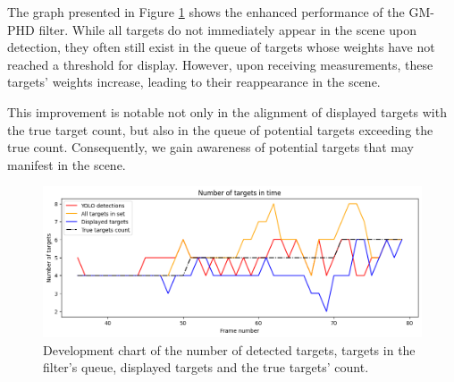 The graph presented in Figure \ref{gr:E1-V1-S1} shows the enhanced performance of the GM-PHD filter. While all
targets do not immediately appear in the scene upon detection, they often still exist in the queue of targets
whose weights
have
not reached a threshold for display. However, upon receiving measurements, these targets' weights increase, leading to their reappearance in the scene.

This improvement is notable not only in the alignment of displayed targets with the true target count, but also in
the queue of potential targets exceeding the true count. Consequently, we gain awareness of potential targets that may manifest in the scene.


\begin{figure}[H]
    \centering
    \includegraphics[width=\linewidth]{../../../experiments/E1/V1/YOLO/yolo_det}
    \caption{Development chart of the number of detected targets, targets in the filter's queue, displayed targets and
    the true
    targets' count.}
    \label{gr:E1-V1-S1}
\end{figure}

